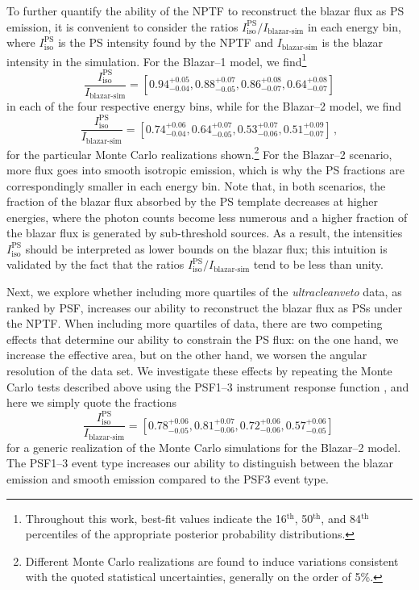 To further quantify the ability of the NPTF to reconstruct the blazar flux as PS emission, it is convenient to consider the ratios $I_\text{iso}^\text{PS} / I_\text{blazar-sim}$ in each energy bin, where $I_\text{iso}^\text{PS}$ is the PS intensity found by the NPTF and $ I_\text{blazar-sim}$ is the blazar intensity in the simulation.  For the Blazar--1 model, we find\footnote{Throughout this work, best-fit values indicate the 16$^\text{th}$, 50$^\text{th}$, and 84$^\text{th}$ percentiles of the appropriate posterior probability distributions. } 
\begin{equation}
\frac{I_\text{iso}^\text{PS}}{ I_\text{blazar-sim}} = [0.94_{-0.04}^{+0.05}, 0.88_{-0.05}^{+0.07}, 0.86_{-0.07}^{+0.08}, 0.64_{-0.07}^{+0.08}] \nonumber
\end{equation}
in each of the four respective energy bins, while for the Blazar--2 model, we find
\begin{equation}
\frac{I_\text{iso}^\text{PS}}{ I_\text{blazar-sim}} = [0.74_{-0.04}^{+0.06}, 0.64_{-0.05}^{+0.07}, 0.53_{-0.06}^{+0.07}, 0.51_{-0.07}^{+0.09}]\,, \nonumber
\end{equation}
 for the particular Monte Carlo realizations shown.\footnote{Different Monte Carlo realizations are found to induce variations consistent with the quoted statistical uncertainties, generally on the order of 5\%.}
For the Blazar--2 scenario, more flux goes into smooth isotropic emission, which is why the PS fractions are correspondingly smaller in each energy bin.  Note that, in both scenarios, the fraction of the blazar flux absorbed by the PS template decreases at higher energies, where the photon counts become less numerous and a higher fraction of the blazar flux is generated by sub-threshold sources.  As a result, the intensities $I_\text{iso}^\text{PS}$ should be interpreted as lower bounds on the blazar flux; this intuition is validated by the fact that the ratios  $I_\text{iso}^\text{PS} / I_\text{blazar-sim}$ tend to be less than unity.  

Next, we explore whether including more quartiles of the {\it ultracleanveto} data, as ranked by PSF, increases our ability to reconstruct the blazar flux as PSs under the NPTF.  When including more quartiles of data, there are two competing effects that determine our ability to constrain the PS flux: on the one hand,  we increase the effective area, but on the other hand, we worsen the angular resolution of the data set.  We investigate these effects by repeating the Monte Carlo tests described above using the PSF1--3 instrument response function
, and here we simply quote the fractions 
\begin{equation}
\frac{ I_\text{iso}^\text{PS}}{ I_\text{blazar-sim}} = [0.78_{-0.05}^{+0.06}, 0.81_{-0.06}^{+0.07}, 0.72_{-0.06}^{+0.06}, 0.57_{-0.05}^{+0.06}]\,  \nonumber
 \end{equation}
 for a generic realization of the Monte Carlo simulations for the Blazar--2 model.  The PSF1--3 event type increases our ability to distinguish between the blazar emission and smooth emission compared to the PSF3 event type.      


